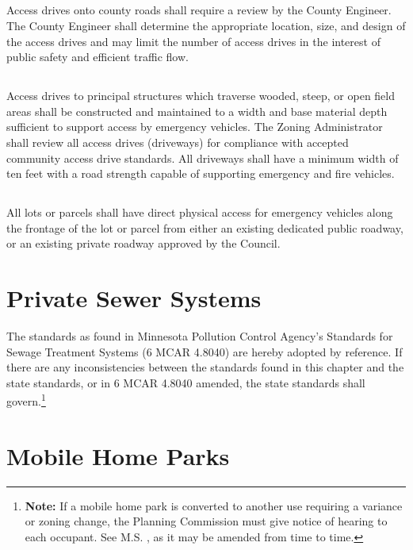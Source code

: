 \subsection{}
Access drives onto county roads shall require a review by the County Engineer.  The County Engineer shall determine the appropriate location, size, and design of the access drives and may limit the number of access drives in the interest of public safety and efficient traffic flow.
\subsection{}
Access drives to principal structures which traverse wooded, steep, or open field areas shall be constructed and maintained to a width and base material depth sufficient to support access by emergency vehicles. The Zoning Administrator shall review all access drives (driveways) for compliance with accepted community access drive standards. All driveways shall have a minimum width of ten feet with a road strength capable of supporting emergency and fire vehicles.
\subsection{}
All lots or parcels shall have direct physical access for emergency vehicles along the frontage of the lot or parcel from either an existing dedicated public roadway, or an existing private roadway approved by the Council.

\section{Private Sewer Systems}
The standards as found in Minnesota Pollution Control Agency’s Standards for Sewage Treatment Systems (6 MCAR 4.8040) are hereby adopted by reference. If there are any inconsistencies between the standards found in this chapter and the state standards, or in 6 MCAR 4.8040 amended, the state standards shall govern.\footnote{\textbf{Note:} If a mobile home park is converted to another use requiring a variance or zoning change, the Planning Commission must give notice of hearing to each occupant. See M.S. , as it may be amended from time to time.}\\

\section{Mobile Home Parks}
